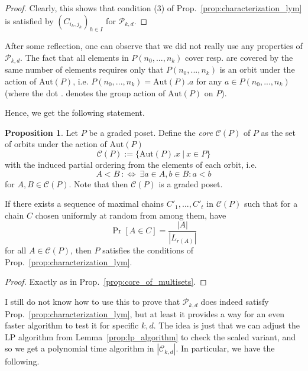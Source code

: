 \documentclass{scrartcl}
\theoremstyle{definition}
\newtheorem{proposition}[definition]{Proposition}
\begin{document}
\begin{proof}
    Clearly, this shows that condition (3) of Prop.~\ref{prop:characterization_lym} is satisfied by $(C_{i_h, j_h})_{h \in I}$ for $\mathcal{P}_{k, d}$.
\end{proof}
After some reflection, one can observe that we did not really use any properties of $\mathcal{P}_{k, d}$.
The fact that all elements in $P(n_0, ..., n_k)$ cover resp. are covered by the same number of elements requires only that $P(n_0, ..., n_k)$ is an orbit under the action of $\mathrm{Aut}(P)$, i.e. $P(n_0, ..., n_k) = \mathrm{Aut}(P).a$ for any $a \in P(n_0, ..., n_k)$
(where the dot $.$ denotes the group action of $\mathrm{Aut}(P)$ on $P$).

Hence, we get the following statement.
\begin{proposition}
    Let $P$ be a graded poset. Define the \emph{core} $\mathcal{C}(P)$ of $P$ as the set of orbits under the action of $\mathrm{Aut}(P)$ 
    \begin{equation*}
        \mathcal{C}(P) := \{ \mathrm{Aut}(P).x \ | \ x \in P \}
    \end{equation*}
    with the induced partial ordering from the elements of each orbit, i.e.
    \begin{equation*}
        A < B \ :\Leftrightarrow \ \exists a \in A, b \in B: a < b
    \end{equation*}
    for $A, B \in \mathcal{C}(P)$.
    Note that then $\mathcal{C}(P)$ is a graded poset.
    
    If there exists a sequence of maximal chains $C'_1, ..., C'_t$ in $\mathcal{C}(P)$ such that for a chain $C$ chosen uniformly at random from among them, have
    \begin{equation*}
        \Pr[A \in C] = \frac {|A|} {|L_{r(A)}|}
    \end{equation*}
    for all $A \in \mathcal{C}(P)$, then $P$ satisfies the conditions of Prop.~\ref{prop:characterization_lym}.
\end{proposition}
\begin{proof}
    Exactly as in Prop.~\ref{prop:core_of_multisets}.
\end{proof}
I still do not know how to use this to prove that $\mathcal{P}_{k, d}$ does indeed satisfy Prop.~\ref{prop:characterization_lym}, but at least it provides a way for an even faster algorithm to test it for specific $k, d$.
The idea is just that we can adjust the LP algorithm from Lemma~\ref{prop:lp_algorithm} to check the scaled variant, and so we get a polynomial time algorithm in $|\mathcal{C}_{k, d}|$.
In particular, we have the following.
\end{document}
